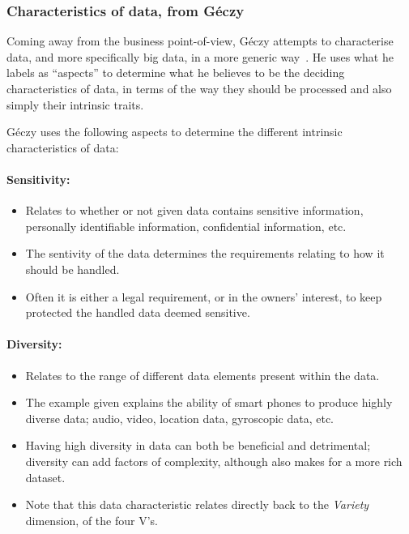 \documentclass[a4paper,11pt]{article}
\begin{document}


\subsubsection{Characteristics of data, from G\'eczy} %
\label{ssub:characteristics_of_data_from_ge_czy}

Coming away from the business point-of-view, G\'eczy attempts to characterise data, and more specifically big data,  in
a more generic way~\cite{geczy_big_2014}. He uses what he labels as ``aspects'' to determine what he believes to be the
deciding characteristics of data, in terms of the way they should be processed and also simply their intrinsic traits.

G\'eczy uses the following aspects to determine the different intrinsic characteristics of data:

\paragraph{Sensitivity:}

\begin{itemize}
  \item Relates to whether or not given data contains sensitive information, \ie{}personally identifiable information,
  confidential information, etc.
  \item The sentivity of the data determines the requirements relating to how it should be handled.
  \item Often it is either a legal requirement, or in the owners' interest, to keep protected the handled data deemed sensitive.
\end{itemize}


\paragraph{Diversity:}

\begin{itemize}
  \item Relates to the range of different data elements present within the data.
  \item The example given explains the ability of smart phones to produce highly diverse data; \eg{}audio, video, location
  data, gyroscopic data, etc.
  \item Having high diversity in data can both be beneficial and detrimental; diversity can add factors of complexity,
  although also makes for a more rich dataset.
  \item Note that this data characteristic relates directly back to the \emph{Variety} dimension, of the four V's.
\end{itemize}
\end{document}
